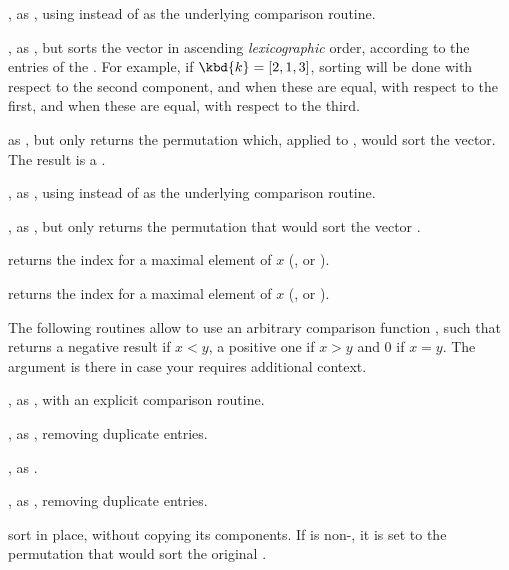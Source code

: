 , as , using  instead of
 as the underlying comparison routine.

, as , but sorts the
vector  in ascending \emph{lexicographic} order, according to the
entries of the  . For example,  if $\kbd{k} = [2,1,3]$,
sorting will be done with respect to the second component,  and when these
are  equal, with respect to the first,  and when these are equal,  with
respect to the third.


 as , but only returns the permutation
which, applied to , would sort the vector. The result is a
.

, as , using 
instead of  as the underlying comparison routine.

, as , but only
returns the permutation that would sort the vector .

 returns the index for a maximal element of $x$
(,  or ).

 returns the index for a maximal element of $x$
(,  or ).


 The following routines allow to use an
arbitrary comparison function ,
such that  returns a negative result if $x
< y$, a positive one if $x > y$ and 0 if $x = y$. The  argument is
there in case your  requires additional context.

, as
, with an explicit comparison routine.

, as
, removing duplicate entries.

,
as .

,
as , removing duplicate entries.

 sort  in place, without copying its components. If
 is non-, it is set to the permutation that would sort
the original .

